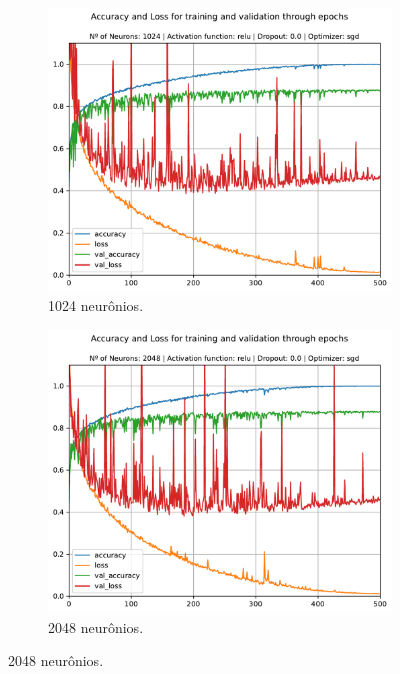 \begin{figure}[H]
\begin{subfigure}[H]{0.49\textwidth}
	\end{subfigure}
	\begin{subfigure}[H]{0.49\textwidth}
		\centering
		\includegraphics[width = \textwidth]{../../plot/mlp/mlp_1024_relu_0.0_sgd}
		\caption{1024 neurônios.}
		\label{fig:mlp_1024_relu_0.0_sgd}
	\end{subfigure}
	\begin{subfigure}[H]{0.49\textwidth}
		\centering
		\includegraphics[width = \textwidth]{../../plot/mlp/mlp_2048_relu_0.0_sgd}
		\caption{2048 neurônios.}
		\label{fig:mlp_2048_relu_0.0_sgd}

\end{subfigure}
\end{figure}

